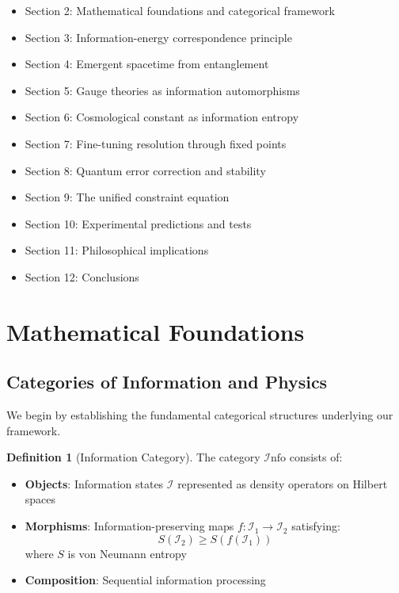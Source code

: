 \documentclass[11pt,a4paper]{article}
\theoremstyle{definition}
\newtheorem{definition}{Definition}[section]
\newcommand{\Info}{\mathcal{I}\text{nfo}}
\begin{document}
\begin{itemize}
\item Section 2: Mathematical foundations and categorical framework
\item Section 3: Information-energy correspondence principle
\item Section 4: Emergent spacetime from entanglement
\item Section 5: Gauge theories as information automorphisms
\item Section 6: Cosmological constant as information entropy
\item Section 7: Fine-tuning resolution through fixed points
\item Section 8: Quantum error correction and stability
\item Section 9: The unified constraint equation
\item Section 10: Experimental predictions and tests
\item Section 11: Philosophical implications
\item Section 12: Conclusions
\end{itemize}

\section{Mathematical Foundations}

\subsection{Categories of Information and Physics}

We begin by establishing the fundamental categorical structures underlying our framework.

\begin{definition}[Information Category]
The category $\Info$ consists of:
\begin{itemize}
\item \textbf{Objects}: Information states $\mathcal{I}$ represented as density operators on Hilbert spaces
\item \textbf{Morphisms}: Information-preserving maps $f: \mathcal{I}_1 \to \mathcal{I}_2$ satisfying:
\[S(\mathcal{I}_2) \geq S(f(\mathcal{I}_1))\]
where $S$ is von Neumann entropy
\item \textbf{Composition}: Sequential information processing
\end{itemize}
\end{definition}
\end{document}

